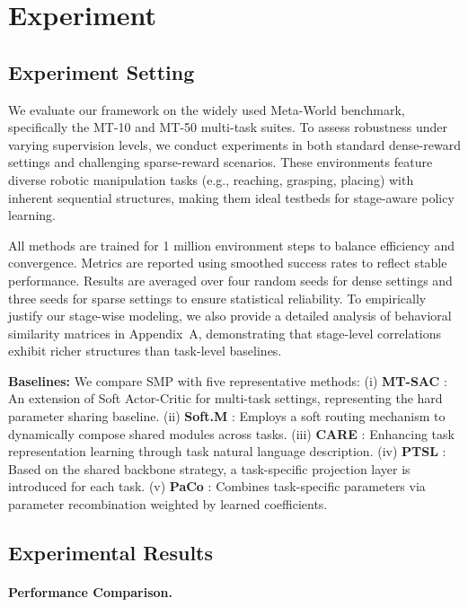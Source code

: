 \documentclass{article}
\begin{document}
\section{Experiment}

\subsection{Experiment Setting}

We evaluate our framework on the widely used Meta-World \cite{q15} benchmark, specifically the MT-10 and MT-50 multi-task suites. 
To assess robustness under varying supervision levels, we conduct experiments in both standard dense-reward settings and challenging sparse-reward scenarios. 
These environments feature diverse robotic manipulation tasks (e.g., reaching, grasping, placing) with inherent sequential structures, making them ideal testbeds for stage-aware policy learning.

All methods are trained for 1 million environment steps to balance efficiency and convergence. 
Metrics are reported using smoothed success rates to reflect stable performance. 
Results are averaged over four random seeds for dense settings and three seeds for sparse settings to ensure statistical reliability. 
To empirically justify our stage-wise modeling, we also provide a detailed analysis of behavioral similarity matrices in Appendix~A, demonstrating that stage-level correlations exhibit richer structures than task-level baselines.


\textbf{Baselines:} We compare SMP with five representative methods:
(i) \textbf{MT-SAC} \cite{q15}: An extension of Soft Actor-Critic for multi-task settings, representing the hard parameter sharing baseline.
(ii) \textbf{Soft.M} \cite{q51}: Employs a soft routing mechanism to dynamically compose shared modules across tasks.
(iii) \textbf{CARE} \cite{q69}: Enhancing task representation learning through task natural language description.
(iv) \textbf{PTSL} \cite{q43}: Based on the shared backbone strategy, a task-specific projection layer is introduced for each task.
(v)  \textbf{PaCo} \cite{q36}: Combines task-specific parameters via parameter recombination weighted by learned coefficients.




\subsection{Experimental Results}

\paragraph{Performance Comparison.}
\end{document}
